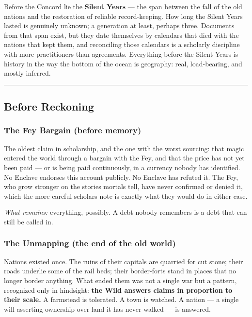 Before the Concord lie the \textbf{Silent Years} --- the span between the fall of the old nations and the restoration of reliable record-keeping. How long the Silent Years lasted is genuinely unknown; a generation at least, perhaps three. Documents from that span exist, but they date themselves by calendars that died with the nations that kept them, and reconciling those calendars is a scholarly discipline with more practitioners than agreements. Everything before the Silent Years is history in the way the bottom of the ocean is geography: real, load-bearing, and mostly inferred.

\medskip\hrule\medskip

\subsection{Before Reckoning}

\subsubsection{The Fey Bargain (before memory)}

The oldest claim in scholarship, and the one with the worst sourcing: that magic entered the world through a bargain with the Fey, and that the price has not yet been paid --- or is being paid continuously, in a currency nobody has identified. No Enclave endorses this account publicly. No Enclave has refuted it. The Fey, who grow stronger on the stories mortals tell, have never confirmed or denied it, which the more careful scholars note is exactly what they would do in either case.

\textit{What remains:} everything, possibly. A debt nobody remembers is a debt that can still be called in.

\subsubsection{The Unmapping (the end of the old world)}

Nations existed once. The ruins of their capitals are quarried for cut stone; their roads underlie some of the rail beds; their border-forts stand in places that no longer border anything. What ended them was not a single war but a pattern, recognized only in hindsight: \textbf{the Wild answers claims in proportion to their scale.} A farmstead is tolerated. A town is watched. A nation --- a single will asserting ownership over land it has never walked --- is answered.


